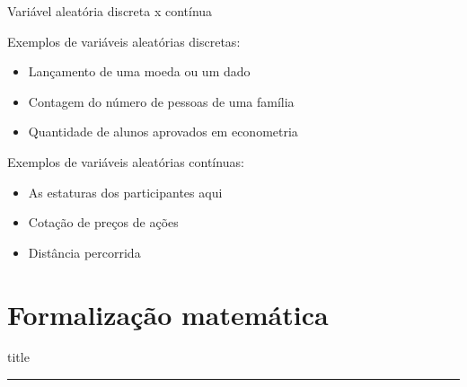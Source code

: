 \documentclass{beamer}
\begin{document}
\begin{frame}{Variável aleatória discreta x contínua}

Exemplos de variáveis aleatórias discretas:
\begin{itemize}
    \item Lançamento de uma moeda ou um dado
    \item Contagem do número de pessoas de uma família
    \item Quantidade de alunos aprovados em econometria
\end{itemize}

\vspace{.5cm}

Exemplos de variáveis aleatórias contínuas:
\begin{itemize}
    \item As estaturas dos participantes aqui
    \item Cotação de preços de ações
    \item Distância percorrida
\end{itemize}

\end{frame}

\section{Formalização matemática}
    \begin{frame}[plain]
        \vfill
      \centering
      \begin{beamercolorbox}[sep=8pt,center,shadow=true,rounded=true]{title}
        \insertsectionhead\par%
        \color{oxfordblue}\noindent\rule{10cm}{1pt} \\
        \LARGE{\faFileTextO}
      \end{beamercolorbox}
      \vfill
  \end{frame}
\end{document}

